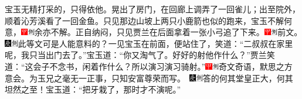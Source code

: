 宝玉无精打采的，只得依他。晃出了房门，在回廊上调弄了一回雀儿；出至院外，顺着沁芳溪看了一回金鱼。只见那边山坡上两只小鹿箭也似的跑来，宝玉不解何意，{\includegraphics[width=3mm]{../Images/00002}\includegraphics[width=3mm]{../Images/00011}\footnotesize \kaishu 余亦不解。}正自纳闷，只见贾兰在后面拿着一张小弓追了下来。{\includegraphics[width=3mm]{../Images/00002}\includegraphics[width=3mm]{../Images/00011}\footnotesize \kaishu 前文。　\includegraphics[width=3mm]{../Images/00004}\includegraphics[width=3mm]{../Images/00011}\footnotesize \kaishu 此等文可是人能意料的？}一见宝玉在前面，便站住了，笑道：``二叔叔在家里呢，我只当出门去了。''宝玉道：``你又淘气了。好好的射他作什么？''贾兰笑道：``这会子不念书，闲着作什么？所以演习演习骑射。''{\includegraphics[width=3mm]{../Images/00002}\includegraphics[width=3mm]{../Images/00011}\footnotesize \kaishu 奇文奇语，默思之方意会。为玉兄之毫无一正事，只知安富尊荣而写。　\includegraphics[width=3mm]{../Images/00004}\includegraphics[width=3mm]{../Images/00011}\footnotesize \kaishu 答的何其堂皇正大，何其坦然之至！}宝玉道：``把牙栽了，那时才不演呢。''

